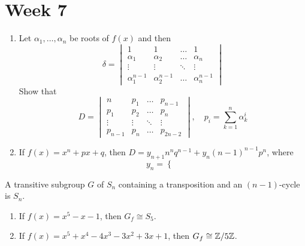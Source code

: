 
\section{Week 7}

\begin{exercise} \mbox{}
  \begin{enumerate}
    \item Let $\alpha_1, \dots, \alpha_n$ be roots of $f(x)$ and then
      \[
        \delta = \begin{vmatrix}
          1 & 1 & \dots & 1 \\
          \alpha_1 & \alpha_2 & \dots & \alpha_n \\
          \vdots & \vdots & \ddots & \vdots \\
          \alpha_1^{n-1} & \alpha_2^{n-1} & \dots & \alpha_n^{n-1}
        \end{vmatrix}
      \]
      Show that 
      \[
        D =  \begin{vmatrix}
          n & p_1 & \dots & p_{n-1} \\
          p_1 & p_2 & \dots & p_n \\
          \vdots & \vdots & \ddots & \vdots \\
          p_{n-1} & p_n & \dots & p_{2n-2}
        \end{vmatrix},
        \quad p_i = \sum_{k=1}^n \alpha_k^i
      \]
    \item If $f(x) = x^n + px + q$, then $D = y_{n+1}n^n q^{n-1} +
      y_n(n-1)^{n-1} p^n$, where
      \[
        y_n = \begin{cases}
        \end{cases}
      \]
  \end{enumerate}
\end{exercise}

\begin{exercise}
  A transitive subgroup $G$ of $S_n$ containing a transposition and an
  $(n-1)$-cycle is $S_n$.
\end{exercise}

\begin{exercise} \mbox{}
  \begin{enumerate}
    \item If $f(x) = x^5 - x - 1$, then $G_f \cong S_5$.
    \item If $f(x) = x^5 + x^4 - 4x^3 - 3x^2 + 3x + 1$, then
      $G_f \cong {\mathbb{Z}}/{5\mathbb{Z}}$.
  \end{enumerate}
\end{exercise}
